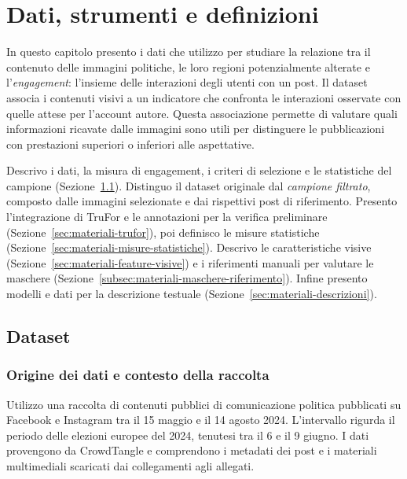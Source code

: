 
\chapter{Dati, strumenti e definizioni}
\label{chap:dataset}

In questo capitolo presento i dati che utilizzo per studiare la relazione tra il contenuto delle immagini politiche, le loro regioni potenzialmente alterate e l'\emph{engagement}: l'insieme delle interazioni degli utenti con un post. Il dataset associa i contenuti visivi a un indicatore che confronta le interazioni osservate con quelle attese per l'account autore. Questa associazione permette di valutare quali informazioni ricavate dalle immagini sono utili per distinguere le pubblicazioni con prestazioni superiori o inferiori alle aspettative.

Descrivo i dati, la misura di engagement, i criteri di selezione e le statistiche del campione (Sezione~\ref{sec:materiali-dataset}). Distinguo il dataset originale dal \emph{campione filtrato}, composto dalle immagini selezionate e dai rispettivi post di riferimento. Presento l'integrazione di TruFor e le annotazioni per la verifica preliminare (Sezione~\ref{sec:materiali-trufor}), poi definisco le misure statistiche (Sezione~\ref{sec:materiali-misure-statistiche}). Descrivo le caratteristiche visive (Sezione~\ref{sec:materiali-feature-visive}) e i riferimenti manuali per valutare le maschere (Sezione~\ref{subsec:materiali-maschere-riferimento}). Infine presento modelli e dati per la descrizione testuale (Sezione~\ref{sec:materiali-descrizioni}).

\section{Dataset}
\label{sec:materiali-dataset}

\subsection{Origine dei dati e contesto della raccolta}
\label{sec:dataset-origine}

Utilizzo una raccolta di contenuti pubblici di comunicazione politica pubblicati su Facebook e Instagram tra il 15 maggio e il 14 agosto 2024. L'intervallo rigurda il periodo delle elezioni europee del 2024, tenutesi tra il 6 e il 9 giugno. I dati provengono da CrowdTangle e comprendono i metadati dei post e i materiali multimediali scaricati dai collegamenti agli allegati.


